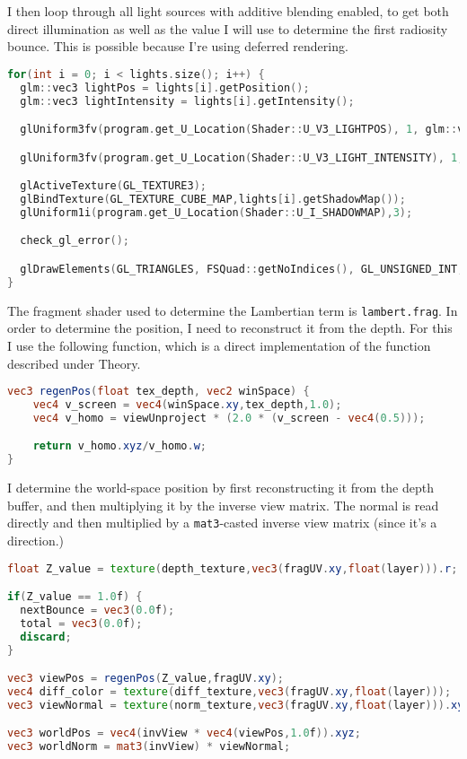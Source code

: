 I then loop through all light sources with additive blending enabled, to get both direct illumination as well as the value I will use to determine the first radiosity bounce. This is possible because I're using deferred rendering.
\begin{lstlisting}[caption={Filters.cpp},language=c++]
for(int i = 0; i < lights.size(); i++) {
  glm::vec3 lightPos = lights[i].getPosition();
  glm::vec3 lightIntensity = lights[i].getIntensity();

  glUniform3fv(program.get_U_Location(Shader::U_V3_LIGHTPOS), 1, glm::value_ptr(lightPos));

  glUniform3fv(program.get_U_Location(Shader::U_V3_LIGHT_INTENSITY), 1, glm::value_ptr(lightIntensity));

  glActiveTexture(GL_TEXTURE3);
  glBindTexture(GL_TEXTURE_CUBE_MAP,lights[i].getShadowMap());
  glUniform1i(program.get_U_Location(Shader::U_I_SHADOWMAP),3);

  check_gl_error();

  glDrawElements(GL_TRIANGLES, FSQuad::getNoIndices(), GL_UNSIGNED_INT, (void *) 0);
}
\end{lstlisting}

The fragment shader used to determine the Lambertian term is \verb=lambert.frag=. In order to determine the position, I need to reconstruct it from the depth. For this I use the following function, which is a direct implementation of the function described under Theory.
\begin{lstlisting}[language=GLSL]
vec3 regenPos(float tex_depth, vec2 winSpace) {
	vec4 v_screen = vec4(winSpace.xy,tex_depth,1.0);
	vec4 v_homo = viewUnproject * (2.0 * (v_screen - vec4(0.5)));

	return v_homo.xyz/v_homo.w;
}
\end{lstlisting}

I determine the world-space position by first reconstructing it from the depth buffer, and then multiplying it by the inverse view matrix. The normal is read directly and then multiplied by a \verb=mat3=-casted inverse view matrix (since it's a direction.)
\begin{lstlisting}[caption={lambert.frag},language=GLSL]
float Z_value = texture(depth_texture,vec3(fragUV.xy,float(layer))).r;

if(Z_value == 1.0f) {
  nextBounce = vec3(0.0f);
  total = vec3(0.0f);
  discard;
}

vec3 viewPos = regenPos(Z_value,fragUV.xy);
vec4 diff_color = texture(diff_texture,vec3(fragUV.xy,float(layer)));
vec3 viewNormal = texture(norm_texture,vec3(fragUV.xy,float(layer))).xyz;

vec3 worldPos = vec4(invView * vec4(viewPos,1.0f)).xyz;
vec3 worldNorm = mat3(invView) * viewNormal;
\end{lstlisting}

